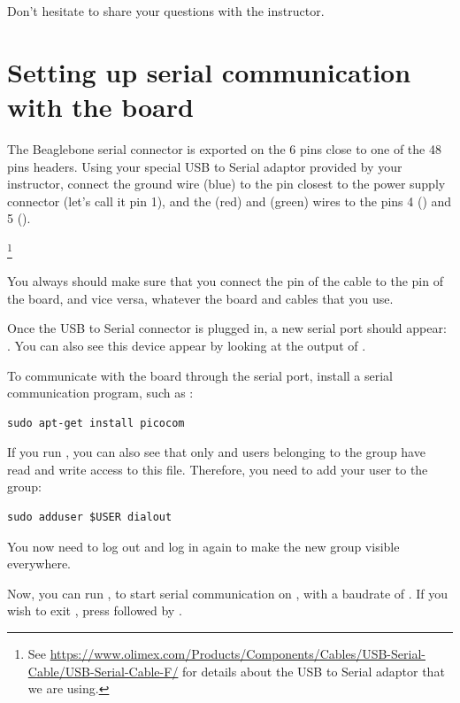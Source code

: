 Don't hesitate to share your questions with the instructor.

\section{Setting up serial communication with the board}

The Beaglebone serial connector is exported on the 6 pins close to one
of the 48 pins headers. Using your special USB to Serial adaptor provided
by your instructor, connect the ground wire (blue) to the pin closest
to the power supply connector (let's call it pin 1), and the  (red)
and  (green) wires to the pins 4 () and 5 ().

\footnote{See
\url{https://www.olimex.com/Products/Components/Cables/USB-Serial-Cable/USB-Serial-Cable-F/}
for details about the USB to Serial adaptor that we are using.} 

You always should make sure that you connect the  pin of the cable
to the  pin of the board, and vice versa, whatever the board and
cables that you use.

Once the USB to Serial connector is plugged in, a new serial port
should appear: .  You can also see this device
appear by looking at the output of .

To communicate with the board through the serial port, install a
serial communication program, such as :

\begin{verbatim}
sudo apt-get install picocom
\end{verbatim}

If you run , you can also see that only
 and users belonging to the  group have
read and write access to this file. Therefore, you need to add your user
to the  group:

\begin{verbatim}
sudo adduser $USER dialout
\end{verbatim}

You now need to log out and log in again to make the new group
visible everywhere.

Now, you can run , to start serial
communication on , with a baudrate of . If
you wish to exit , press \code{[Ctrl][a]} followed by
\code{[Ctrl][x]}.

